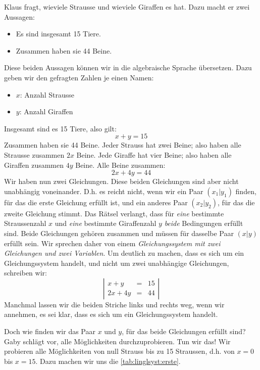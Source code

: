 \documentclass[%
11pt,%
twoside,%
titlepage,%
german,%
]{scrartcl}
\newenvironment{system}{\begin{displaymath}
  \left| 
    \begin{array}{rcl}}{\end{array} \right| 
\end{displaymath}}
\begin{document}
\medskip

Klaus fragt, wieviele Strausse und wieviele Giraffen es hat. Dazu macht er zwei Aussagen:
\begin{itemize}
\item Es sind insgesamt 15 Tiere.
\item Zusammen haben sie 44 Beine.
\end{itemize}
Diese beiden Aussagen k\"onnen wir in die algebraische Sprache \"ubersetzen. Dazu geben wir den gefragten Zahlen je einen Namen:
\begin{itemize}
  \item $x$: Anzahl Strausse
  \item $y$: Anzahl Giraffen
\end{itemize}
Insgesamt sind es 15 Tiere, also gilt:
\begin{displaymath}
  x+y = 15
\end{displaymath}
Zusammen haben sie 44 Beine. Jeder Strauss hat zwei Beine; also haben alle Strausse zusammen $2x$ Beine. Jede Giraffe hat vier Beine; also haben alle Giraffen zusammen $4y$ Beine. Alle Beine zusammen:
\begin{displaymath}
  2x+4y=44
\end{displaymath}
Wir haben nun zwei Gleichungen. Diese beiden Gleichungen sind aber nicht unabh\"angig voneinander. D.h. es reicht nicht, wenn wir ein Paar $(x_1|y_1)$ finden, f\"ur das die erste Gleichung erf\"ullt ist, und ein anderes Paar $(x_2|y_2)$, f\"ur das die zweite Gleichung stimmt. Das R\"atsel verlangt, dass f\"ur \emph{eine} bestimmte Straussenzahl $x$ und \emph{eine} bestimmte Giraffenzahl $y$ \emph{beide} Bedingungen erf\"ullt sind. Beide Gleichungen geh\"oren zusammen und m\"ussen f\"ur dasselbe Paar $(x|y)$ erf\"ullt sein. Wir sprechen daher von einem \emph{Gleichungssystem mit zwei Gleichungen und zwei Variablen}. Um deutlich zu machen, dass es sich um ein Gleichungssystem handelt, und nicht um zwei unabh\"angige Gleichungen, schreiben wir:
\begin{system}
  x+y & = & 15 \\
  2x+4y & = & 44
\end{system}Manchmal lassen wir die beiden Striche links und rechts weg, wenn wir annehmen, es sei klar, dass es sich um ein Gleichungssystem handelt.

\label{linglsyst:probieren}

Doch wie finden wir das Paar $x$ und $y$, f\"ur das beide Gleichungen erf\"ullt sind? Gaby schl\"agt vor, alle M\"oglichkeiten durchzuprobieren. Tun wir das! Wir probieren alle M\"oglichkeiten von null Strauss bis zu 15 Straussen, d.h. von $x=0$ bis $x=15$. Dazu machen wir uns die \ref{tab:linglsyst:erste}.
\end{document}
